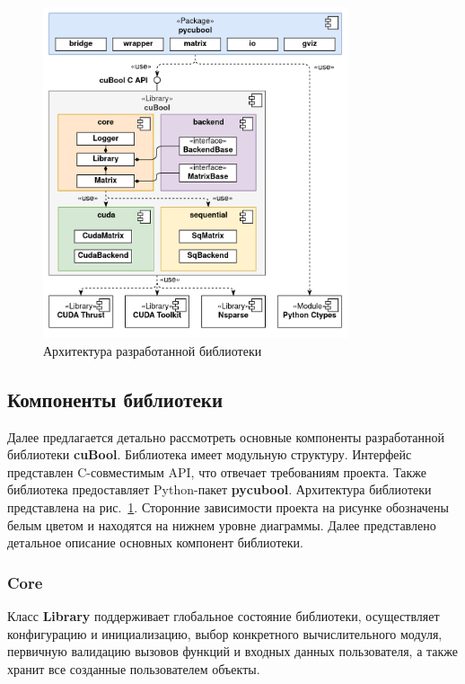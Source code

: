\begin{figure}[h]
    \centering
    \includegraphics[width=0.8\textwidth]{images/library_architecture.png}
    \caption{Архитектура разработанной библиотеки}
    \label{fig:cubool_architecture}
\end{figure}

\subsection{Компоненты библиотеки}

Далее предлагается детально рассмотреть основные компоненты разработанной библиотеки \textbf{cuBool}.
Библиотека имеет модульную структуру. 
Интерфейс представлен C-совместимым API, что отвечает требованиям проекта.
Также библиотека предоставляет Python-пакет \textbf{pycubool}.
Архитектура библиотеки представлена на рис.~\ref{fig:cubool_architecture}.
Сторонние зависимости проекта на рисунке обозначены белым цветом и находятся на нижнем уровне диаграммы. 
Далее представлено детальное описание основных компонент библиотеки.

\subsubsection*{Core}

Класс \textbf{Library} поддерживает глобальное состояние библиотеки, осуществляет конфигурацию и инициализацию, выбор конкретного вычислительного модуля, первичную валидацию вызовов функций и входных данных пользователя, 
а также хранит все созданные пользователем объекты. 

